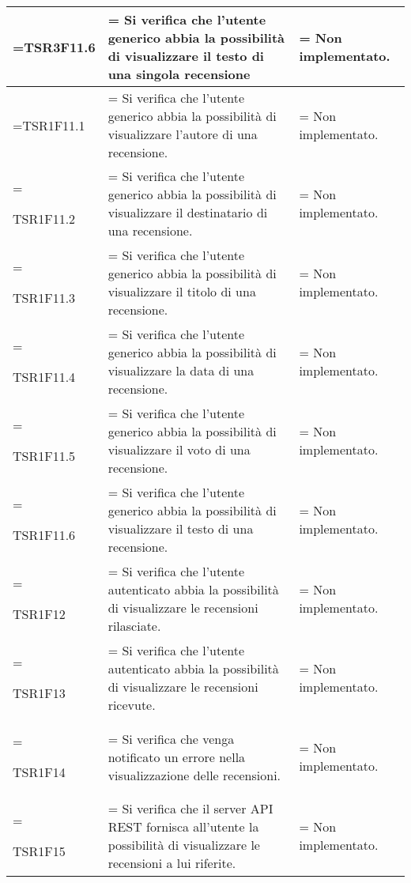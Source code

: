 \begin{xltabular}{\textwidth} {
        >{\hsize\linewidth=\hsize}X
        >{\hsize\linewidth=\hsize}X
        >{\hsize\linewidth=\hsize}X
    }
    TSR3F11.6 &
    Si verifica che l'utente generico abbia la possibilità di visualizzare il testo di una singola recensione  &
    Non implementato.
    \\ \hline
    
    TSR1F11.1 &
    Si verifica che l'utente generico abbia la possibilità di visualizzare l'autore di una recensione.  &
    Non implementato.
    \\ \hline
    
    TSR1F11.2 &
    Si verifica che l'utente generico abbia la possibilità di visualizzare il destinatario di una recensione.  &
    Non implementato.
    \\ \hline

    TSR1F11.3 &
    Si verifica che l'utente generico abbia la possibilità di visualizzare il titolo di una recensione.  &
    Non implementato.
    \\ \hline

    TSR1F11.4 &
    Si verifica che l'utente generico abbia la possibilità di visualizzare la data di una recensione.  &
    Non implementato.
    \\ \hline

    TSR1F11.5 &
    Si verifica che l'utente generico abbia la possibilità di visualizzare il voto di una recensione.  &
    Non implementato.
    \\ \hline

    TSR1F11.6 &
    Si verifica che l'utente generico abbia la possibilità di visualizzare il testo di una recensione.  &
    Non implementato.
    \\ \hline

    TSR1F12 &
    Si verifica che l'utente autenticato abbia la possibilità di visualizzare le recensioni rilasciate.  &
    Non implementato.
    \\ \hline

    TSR1F13 &
    Si verifica che l'utente autenticato abbia la possibilità di visualizzare le recensioni ricevute.  &
    Non implementato.
    \\ \hline

    TSR1F14 &
    Si verifica che venga notificato un errore nella visualizzazione delle recensioni.  &
    Non implementato.
    \\ \hline

    TSR1F15 &
    Si verifica che il server API REST fornisca all'utente la possibilità di visualizzare le recensioni a lui riferite. &
    Non implementato.
    \\ \hline


\end{xltabular}
